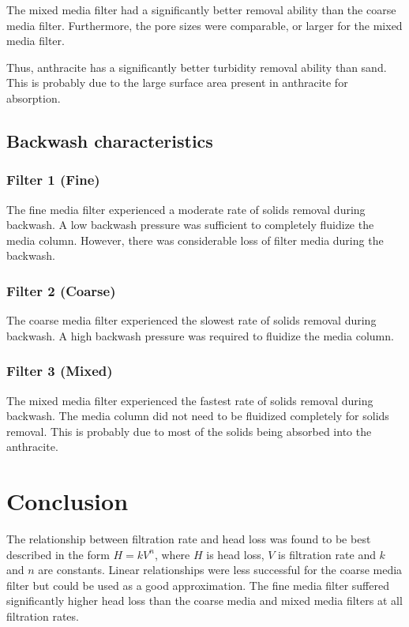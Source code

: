 \documentclass{article}
\begin{document}
The mixed media filter had a significantly better removal ability than the
coarse media filter. Furthermore, the pore sizes were comparable, or larger for the 
mixed media filter. 

Thus, anthracite has a significantly better turbidity removal ability than 
sand. This is probably due to the large surface area present in anthracite for
absorption.


\subsection{Backwash characteristics}
\subsubsection{Filter 1 (Fine)}
The fine media filter experienced a moderate rate of solids removal during backwash.
A low backwash pressure was sufficient to completely fluidize the media column.
However, there was considerable loss of filter media during the backwash.

\subsubsection{Filter 2 (Coarse)}
The coarse media filter experienced the slowest rate of solids removal during 
backwash. A high backwash pressure was required to fluidize the media column.

\subsubsection{Filter 3 (Mixed)}
The mixed media filter experienced the fastest rate of solids removal during 
backwash. The media column did not need to be fluidized completely for solids
removal. This is probably due to most of the solids being absorbed into the 
anthracite.



\section{Conclusion}
The relationship between filtration rate and head loss was found to be best
described in the form $H=kV^n$, where $H$ is head loss, $V$ is filtration rate
and $k$ and $n$ are constants. Linear relationships were less successful for 
the coarse media filter but could be used as a good approximation.
The fine media filter suffered significantly higher head loss than the coarse media and 
mixed media filters at all filtration rates.
\end{document}
